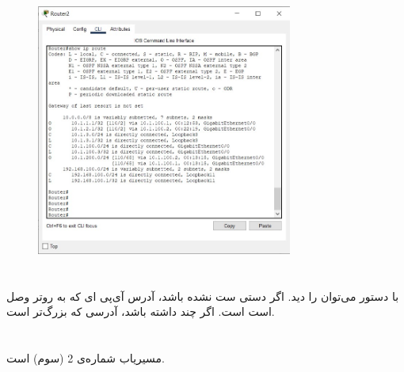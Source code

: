 \documentclass{article}
\begin{document}
\begin{figure}[H]
    \centering
    \includegraphics[width=0.75\textwidth]{figures/17.jpg}
    \caption{}
    \label{fig:fig1}
\end{figure}


\section{}%
با دستور  می‌توان  را دید.
اگر دستی ست نشده باشد، آدرس آی‌پی ای که به روتر وصل است  است. اگر چند  داشته باشد، آدرسی که بزرگ‌تر است.

\section{}%
مسیریاب شماره‌ی 2 (سوم)  است.
\end{document}

